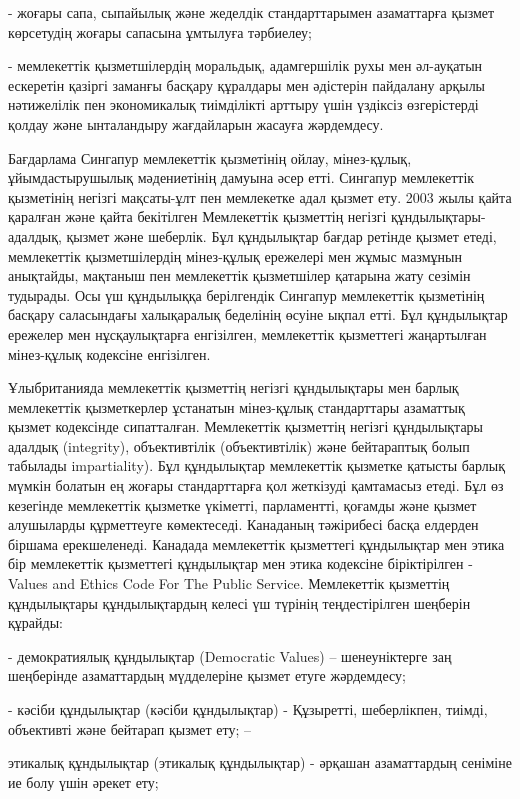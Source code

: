 \begin{multicols}{2}
- жоғары сапа, сыпайылық және жеделдік стандарттарымен азаматтарға
қызмет көрсетудің жоғары сапасына ұмтылуға тәрбиелеу;

- мемлекеттік қызметшілердің моральдық, адамгершілік рухы мен әл-ауқатын
ескеретін қазіргі заманғы басқару құралдары мен әдістерін пайдалану
арқылы нәтижелілік пен экономикалық тиімділікті арттыру үшін үздіксіз
өзгерістерді қолдау және ынталандыру жағдайларын жасауға жәрдемдесу.

Бағдарлама Сингапур мемлекеттік қызметінің ойлау, мінез-құлық,
ұйымдастырушылық мәдениетінің дамуына әсер етті. Сингапур мемлекеттік
қызметінің негізгі мақсаты-ұлт пен мемлекетке адал қызмет ету. 2003 жылы
қайта қаралған және қайта бекітілген Мемлекеттік қызметтің негізгі
құндылықтары-адалдық, қызмет және шеберлік. Бұл құндылықтар бағдар
ретінде қызмет етеді, мемлекеттік қызметшілердің мінез-құлық ережелері
мен жұмыс мазмұнын анықтайды, мақтаныш пен мемлекеттік қызметшілер
қатарына жату сезімін тудырады. Осы үш құндылыққа берілгендік Сингапур
мемлекеттік қызметінің басқару саласындағы халықаралық беделінің өсуіне
ықпал етті. Бұл құндылықтар ережелер мен нұсқаулықтарға енгізілген,
мемлекеттік қызметтегі жаңартылған мінез-құлық кодексіне енгізілген.

Ұлыбританияда мемлекеттік қызметтің негізгі құндылықтары мен барлық
мемлекеттік қызметкерлер ұстанатын мінез-құлық стандарттары азаматтық
қызмет кодексінде сипатталған. Мемлекеттік қызметтің негізгі
құндылықтары адалдық (integrity), объективтілік (объективтілік) және
бейтараптық болып табылады impartiality). Бұл құндылықтар мемлекеттік
қызметке қатысты барлық мүмкін болатын ең жоғары стандарттарға қол
жеткізуді қамтамасыз етеді. Бұл өз кезегінде мемлекеттік қызметке
үкіметті, парламентті, қоғамды және қызмет алушыларды құрметтеуге
көмектеседі. Канаданың тәжірибесі басқа елдерден біршама ерекшеленеді.
Канадада мемлекеттік қызметтегі құндылықтар мен этика бір мемлекеттік
қызметтегі құндылықтар мен этика кодексіне біріктірілген - Values and
Ethics Code For The Public Service. Мемлекеттік қызметтің құндылықтары
құндылықтардың келесі үш түрінің теңдестірілген шеңберін құрайды:

- демократиялық құндылықтар (Democratic Values) -- шенеуніктерге заң
шеңберінде азаматтардың мүдделеріне қызмет етуге жәрдемдесу;

- кәсіби құндылықтар (кәсіби құндылықтар) - Құзыретті, шеберлікпен,
тиімді, объективті және бейтарап қызмет ету; --

этикалық құндылықтар (этикалық құндылықтар) - әрқашан азаматтардың
сеніміне ие болу үшін әрекет ету;


\end{multicols}
